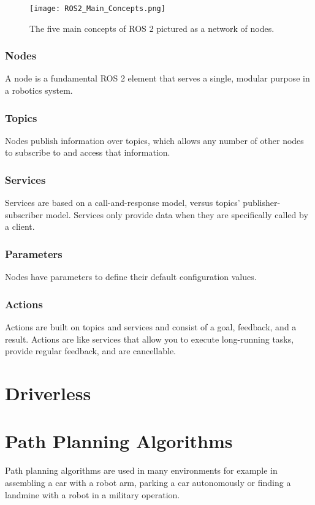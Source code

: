 \begin{figure}[H]
    \centering
    \texttt{[image: ROS2\_Main\_Concepts.png]}
    \caption{The five main concepts of ROS 2 pictured as a network of nodes.}
    \label{fig:ROS 2 main concepts}
\end{figure}

\subsubsection{Nodes}
A node is a fundamental ROS 2 element that serves a single, modular purpose in a robotics system. \cite{ros2_tutorials_nodes}

\subsubsection{Topics}
 Nodes publish information over topics, which allows any number of other nodes to subscribe to and access that information. \cite{ros2_tutorials_topics}

\subsubsection{Services}
Services are based on a call-and-response model, versus topics’ publisher-subscriber model. Services only provide data when they are specifically called by a client. \cite{ros2_tutorials_services}

\subsubsection{Parameters}
Nodes have parameters to define their default configuration values. \cite{ros2_tutorials_parameters}

\subsubsection{Actions}
Actions are built on topics and services and consist of a goal, feedback, and a result. Actions are like services that allow you to execute long-running tasks, provide regular feedback, and are cancellable. \cite{ros2_tutorials_actions}

\section{Driverless}
\lipsum[1]

\section{Path Planning Algorithms}
Path planning algorithms are used in many environments for example in assembling a car with a robot arm, parking a car autonomously or finding a landmine with a robot in a military operation. 

